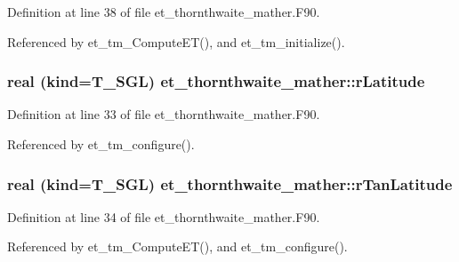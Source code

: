 Definition at line 38 of file et\_\-thornthwaite\_\-mather.F90.



Referenced by et\_\-tm\_\-ComputeET(), and et\_\-tm\_\-initialize().

\hypertarget{namespaceet__thornthwaite__mather_a851c5df67086bf9ccad5d274fe8118c2}{
\subsubsection[{rLatitude}]{\setlength{\rightskip}{0pt plus 5cm}real (kind=T\_\-SGL) {\bf et\_\-thornthwaite\_\-mather::rLatitude}}}
\label{namespaceet__thornthwaite__mather_a851c5df67086bf9ccad5d274fe8118c2}


Definition at line 33 of file et\_\-thornthwaite\_\-mather.F90.



Referenced by et\_\-tm\_\-configure().

\hypertarget{namespaceet__thornthwaite__mather_a668487e9bfd1609275ea1ede77d25206}{
\subsubsection[{rTanLatitude}]{\setlength{\rightskip}{0pt plus 5cm}real (kind=T\_\-SGL) {\bf et\_\-thornthwaite\_\-mather::rTanLatitude}}}
\label{namespaceet__thornthwaite__mather_a668487e9bfd1609275ea1ede77d25206}


Definition at line 34 of file et\_\-thornthwaite\_\-mather.F90.



Referenced by et\_\-tm\_\-ComputeET(), and et\_\-tm\_\-configure().

